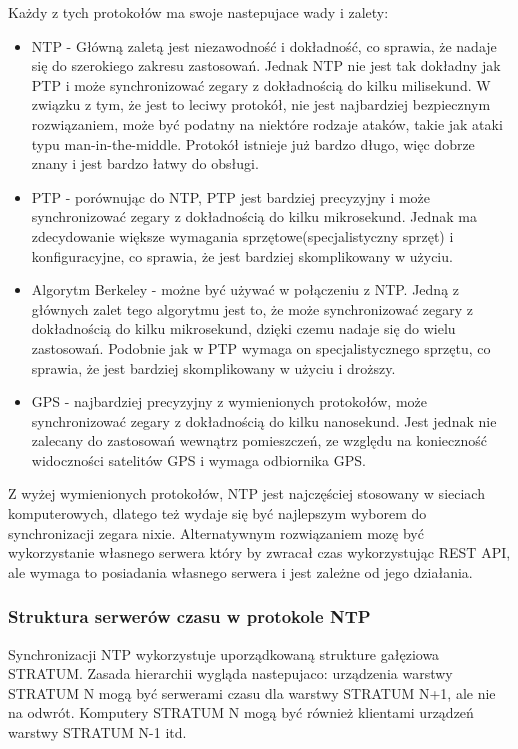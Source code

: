 \documentclass[../main.tex]{subfiles}
\begin{document}
\newpage

Każdy z tych protokołów ma swoje nastepujace wady i zalety:

\begin{itemize}
  \item NTP - Główną zaletą jest niezawodność i dokładność, co sprawia, że nadaje się do szerokiego zakresu zastosowań. 
  Jednak NTP nie jest tak dokładny jak PTP i może synchronizować zegary z dokładnością do kilku milisekund.
  W związku z tym, że jest to leciwy protokół, nie jest najbardziej bezpiecznym rozwiązaniem, 
  może być podatny na niektóre rodzaje ataków, takie jak ataki typu man-in-the-middle.
  Protokół istnieje już bardzo długo, więc dobrze znany i jest bardzo łatwy do obsługi.
  \item PTP - porównując do NTP, PTP jest bardziej precyzyjny i może synchronizować zegary z dokładnością do kilku mikrosekund.
  Jednak ma zdecydowanie większe wymagania sprzętowe(specjalistyczny sprzęt) i konfiguracyjne, co sprawia, że jest bardziej skomplikowany w użyciu.
  \item Algorytm Berkeley - możne być używać w połączeniu z NTP. 
  Jedną z głównych zalet tego algorytmu jest to, że może synchronizować zegary z dokładnością do kilku mikrosekund, dzięki czemu nadaje się do wielu zastosowań.
  Podobnie jak w PTP wymaga on specjalistycznego sprzętu, co sprawia, że jest bardziej skomplikowany w użyciu i droższy.
  \item GPS - najbardziej precyzyjny z wymienionych protokołów, może synchronizować zegary z dokładnością do kilku nanosekund.
  Jest jednak nie zalecany do zastosowań wewnątrz pomieszczeń, ze względu na konieczność widoczności satelitów GPS i wymaga odbiornika GPS.
\end{itemize} 

Z wyżej wymienionych protokołów, NTP jest najczęściej stosowany w sieciach komputerowych, dlatego też wydaje się być najlepszym wyborem do synchronizacji zegara nixie.
Alternatywnym rozwiązaniem mozę być wykorzystanie własnego serwera który by zwracał czas wykorzystując REST API, ale wymaga to posiadania własnego serwera i jest zależne od 
jego działania.

\subsubsection{Struktura serwerów czasu w protokole NTP}
Synchronizacji NTP wykorzystuje uporządkowaną strukture gałęziowa STRATUM. 
Zasada hierarchii wygląda nastepujaco: urządzenia warstwy STRATUM N mogą być serwerami czasu dla warstwy STRATUM N+1, ale nie na odwrót. 
Komputery STRATUM N mogą być również klientami urządzeń warstwy STRATUM N-1 itd.
\end{document}
